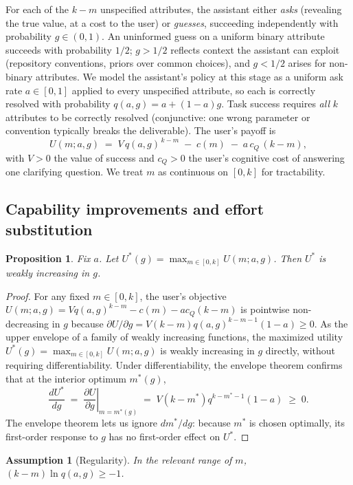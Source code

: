 \documentclass[11pt]{article}
\newtheorem{proposition}{Proposition}
\newtheorem{assumption}{Assumption}
\begin{document}
For each of the $k-m$ unspecified attributes, the assistant either \emph{asks}
(revealing the true value, at a cost to the user) or \emph{guesses}, succeeding
independently with probability $g \in (0,1)$. An uninformed guess on a uniform binary attribute succeeds with probability $1/2$; $g > 1/2$ reflects context the assistant can exploit (repository conventions, priors over common choices), and $g < 1/2$ arises for non-binary attributes. We model the assistant's policy at
this stage as a uniform ask rate $a \in [0,1]$ applied to every unspecified
attribute, so each is correctly resolved with probability
$q(a,g) = a + (1-a)g$. Task success requires \emph{all} $k$ attributes to be
correctly resolved (conjunctive: one wrong parameter or convention typically breaks
the deliverable). The user's payoff is
\[
U(m; a, g) \;=\; V \, q(a,g)^{\,k-m} \;-\; c(m) \;-\; a\,c_Q\,(k-m),
\]
with $V>0$ the value of success and $c_Q>0$ the user's cognitive cost of answering one
clarifying question. We treat $m$ as continuous on $[0,k]$ for tractability.

\subsection{Capability improvements and effort substitution}

\begin{proposition}\label{prop:accuracy}
Fix $a$. Let $U^*(g) = \max_{m \in [0,k]} U(m;a,g)$. Then $U^*$ is weakly
increasing in $g$.
\end{proposition}

\begin{proof}
For any fixed $m \in [0, k]$, the user's objective $U(m; a, g) = V q(a,g)^{k-m} - c(m) - a c_Q(k-m)$ is pointwise non-decreasing in $g$ because $\partial U/\partial g = V(k-m)q(a,g)^{k-m-1}(1-a) \ge 0$. As the upper envelope of a family of weakly increasing functions, the maximized utility $U^*(g) = \max_{m \in [0,k]} U(m;a,g)$ is weakly increasing in $g$ directly, without requiring differentiability. Under differentiability, the envelope theorem confirms that at the interior optimum $m^*(g)$,
\[
\frac{dU^*}{dg} \;=\; \left.\frac{\partial U}{\partial g}\right|_{m=m^*(g)} \;=\; V(k-m^*)q^{k-m^*-1}(1-a) \;\ge\; 0.
\]
The envelope theorem lets us ignore $dm^*/dg$: because $m^*$ is chosen optimally,
its first-order response to $g$ has no first-order effect on $U^*$.
\end{proof}

\begin{assumption}[Regularity]\label{ass:reg}
In the relevant range of $m$, $(k-m)\ln q(a,g) \ge -1$.
\end{assumption}
\end{document}
